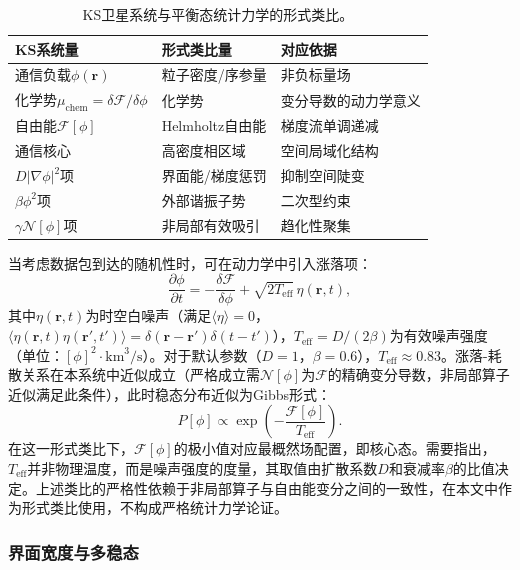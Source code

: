 \documentclass[sn-nature,pdflatex]{sn-jnl}
\begin{document}
\begin{table}[htbp]
\centering
\caption{KS卫星系统与平衡态统计力学的形式类比。}
\label{tab:thermo_analogy}
\begin{tabular}{lll}
\toprule
KS系统量 & 形式类比量 & 对应依据 \\
\midrule
通信负载$\phi(\mathbf{r})$ & 粒子密度/序参量 & 非负标量场 \\
化学势$\mu_{\text{chem}} = \delta\mathcal{F}/\delta\phi$ & 化学势 & 变分导数的动力学意义 \\
自由能$\mathcal{F}[\phi]$ & Helmholtz自由能 & 梯度流单调递减 \\
通信核心 & 高密度相区域 & 空间局域化结构 \\
$D|\nabla\phi|^2$项 & 界面能/梯度惩罚 & 抑制空间陡变 \\
$\beta\phi^2$项 & 外部谐振子势 & 二次型约束 \\
$\gamma \mathcal{N}[\phi]$项 & 非局部有效吸引 & 趋化性聚集 \\
\bottomrule
\end{tabular}
\end{table}

当考虑数据包到达的随机性时，可在动力学中引入涨落项：
\begin{equation}
\frac{\partial \phi}{\partial t} = -\frac{\delta\mathcal{F}}{\delta\phi} + \sqrt{2T_{\text{eff}}}\,\eta(\mathbf{r}, t),
\end{equation}
其中$\eta(\mathbf{r}, t)$为时空白噪声（满足$\langle\eta\rangle = 0$，$\langle\eta(\mathbf{r},t)\eta(\mathbf{r}',t')\rangle = \delta(\mathbf{r}-\mathbf{r}')\delta(t-t')$），$T_{\text{eff}} = D/(2\beta)$为有效噪声强度（单位：$[\phi]^2\cdot\text{km}^3/\text{s}$）。对于默认参数（$D = 1$，$\beta = 0.6$），$T_{\text{eff}} \approx 0.83$。涨落-耗散关系在本系统中近似成立（严格成立需$\mathcal{N}[\phi]$为$\mathcal{F}$的精确变分导数，非局部算子近似满足此条件），此时稳态分布近似为Gibbs形式：
\begin{equation}
P[\phi] \propto \exp\left(-\frac{\mathcal{F}[\phi]}{T_{\text{eff}}}\right).
\end{equation}
在这一形式类比下，$\mathcal{F}[\phi]$的极小值对应最概然场配置，即核心态。需要指出，$T_{\text{eff}}$并非物理温度，而是噪声强度的度量，其取值由扩散系数$D$和衰减率$\beta$的比值决定。上述类比的严格性依赖于非局部算子与自由能变分之间的一致性，在本文中作为形式类比使用，不构成严格统计力学论证。

\subsubsection{界面宽度与多稳态}
\end{document}
